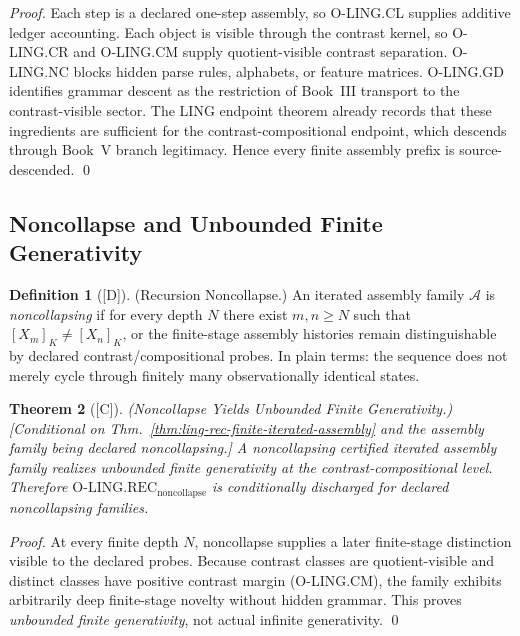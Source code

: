 \documentclass[12pt,oneside]{amsbook}
\theoremstyle{plain}
\newtheorem{theorem}{Theorem}[section]
\theoremstyle{definition}
\newtheorem{definition}[theorem]{Definition}
\theoremstyle{remark}
\newcommand{\status}[1]{\textup{[#1]}}
\begin{document}
\begin{proof}
Each step is a declared one-step assembly, so O-LING.CL supplies
additive ledger accounting. Each object is visible through the
contrast kernel, so O-LING.CR and O-LING.CM supply quotient-visible
contrast separation. O-LING.NC blocks hidden parse rules, alphabets,
or feature matrices. O-LING.GD identifies grammar descent as the
restriction of Book~III transport to the contrast-visible sector.
The LING endpoint theorem already records that these ingredients
are sufficient for the contrast-compositional endpoint, which descends
through Book~V branch legitimacy. Hence every finite assembly prefix
is source-descended.
\qed
\end{proof}

\subsection{Noncollapse and Unbounded Finite Generativity}

\begin{definition}[\status{D}]\label{def:ling-recursion-noncollapse}
\textup{(Recursion Noncollapse.)}
An iterated assembly family $\mathcal{A}$ is \emph{noncollapsing}
if for every depth $N$ there exist $m, n \ge N$ such that
$[X_m]_K \neq [X_n]_K$, or the finite-stage assembly histories
remain distinguishable by declared contrast/compositional probes.
In plain terms: the sequence does not merely cycle through finitely
many observationally identical states.
\end{definition}

\begin{theorem}[\status{C}]\label{thm:ling-rec-noncollapse-criterion}
\textup{(Noncollapse Yields Unbounded Finite Generativity.)}
\textup{[Conditional on Thm.~\ref{thm:ling-rec-finite-iterated-assembly}
and the assembly family being declared noncollapsing.]}
A noncollapsing certified iterated assembly family realizes unbounded
finite generativity at the contrast-compositional level.
Therefore $\mathrm{O\text{-}LING.REC}_{\mathrm{noncollapse}}$ is
conditionally discharged for declared noncollapsing families.
\end{theorem}

\begin{proof}
At every finite depth $N$, noncollapse supplies a later finite-stage
distinction visible to the declared probes. Because contrast classes
are quotient-visible and distinct classes have positive contrast margin
(O-LING.CM), the family exhibits arbitrarily deep finite-stage novelty
without hidden grammar. This proves \emph{unbounded finite generativity},
not actual infinite generativity.
\qed
\end{proof}
\end{document}
